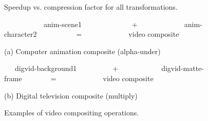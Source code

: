 \begin{figure}[t]
\centering
{}
\caption{Speedup vs. compression factor for all transformations.
\protect\label{fig:speedup-scatter}}
\end{figure}

\begin{figure}[t]
\centering
\begin{minipage}{0.3\textwidth}
\centering
{}
\vspace{2pt}
\end{minipage}
\begin{minipage}{0.3\textwidth}
\centering
{}
\vspace{2pt}
\end{minipage}
\begin{minipage}{0.3\textwidth}
\centering
{}
\vspace{2pt}
\end{minipage}

{\small ~~~~~~~~~~~anim-scene1~~~~~~~~~~~~~~+~~~~~~~~~~~~~anim-character2~~~~~~~~~~~=~~~~~~~~~~~~~video composite~~~~~~~}

\begin{center}
\vspace{-3pt}
(a) Computer animation composite (alpha-under)
\end{center} \vspace{12pt}

\begin{minipage}{0.3\textwidth}
\centering
{}
\vspace{2pt}
\end{minipage}
\begin{minipage}{0.3\textwidth}
\centering
{}
\vspace{2pt}
\end{minipage}
\begin{minipage}{0.3\textwidth}
\centering
{}
\vspace{2pt}
\end{minipage}

{\small ~~~digvid-background1~~~~~~~~~~+~~~~~~~~~~~~digvid-matte-frame~~~~~~~~=~~~~~~~~~~~~~video composite~~~~~~~}

\begin{center}
\vspace{-3pt}
(b) Digital television composite (multiply)
\end{center}
\vspace{-3pt}
\caption{Examples of video compositing operations.\protect\label{fig:videos}}
\end{figure}

